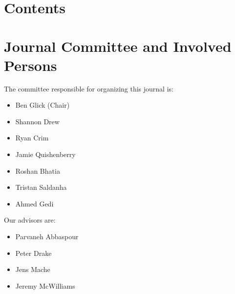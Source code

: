 \documentclass[12pt]{article}
\begin{document}
\begin{titlepage}
	
	
    
    
    
    
	
\end{titlepage}

\section{Contents}
\newcommand{\addsection}[3]{\addtocontents{toc}{\protect\contentsline{section}{\protect\numberline{#1}#2}{#3}}}
\newcommand{\addsubsection}[3]{\addtocontents{toc}{\protect\contentsline{subsection}{\protect\numberline{#1}#2}{#3}}}



\tableofcontents




\section{Journal Committee and Involved Persons}
The committee responsible for organizing this journal is:
\begin{itemize}
  \item Ben Glick (Chair)
  \item Shannon Drew
  \item Ryan Crim
  \item Jamie Quishenberry
  \item Roshan Bhatia
  \item Tristan Saldanha
  \item Ahmed Gedi
\end{itemize}
Our advisors are:
\begin{itemize}
  \item Parvaneh Abbaspour
  \item Peter Drake
  \item Jens Mache
  \item Jeremy McWilliams
\end{itemize}
\end{document}
